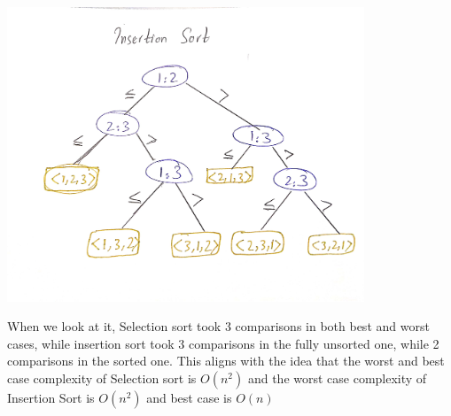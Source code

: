 \documentclass[a4paper]{exam}
\begin{document}
\begin{questions}
\begin{solution}
\includegraphics[width=0.8\textwidth]{insert.jpeg}

    When we look at it, Selection sort took 3 comparisons in both best and worst cases, while insertion sort took 3 comparisons in the fully unsorted one, while 2 comparisons in the sorted one. This aligns with the idea that the worst and best case complexity of Selection sort is $O(n^2)$ and the worst case complexity of Insertion Sort is $O(n^2)$ and best case is $O(n)$

\end{solution}
\end{questions}
\end{document}
